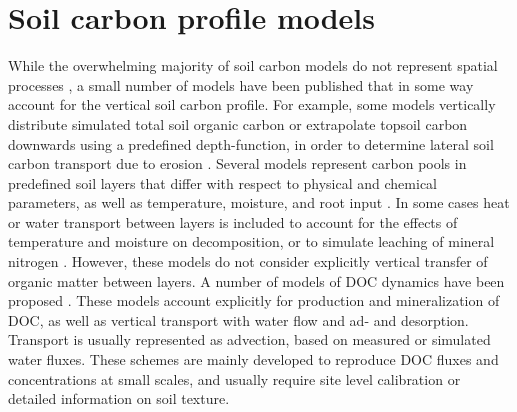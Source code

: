 \documentclass[11pt, oneside, a4paper]{article}   	%
\begin{document}


\section{Soil carbon profile models} \label{sec:models}
While the overwhelming majority of soil carbon models do not represent spatial processes \citep{Manzoni2009}, a small number of models have been published that in some way account for the
vertical soil carbon profile. For example, some models vertically distribute simulated total soil organic carbon or extrapolate topsoil carbon downwards using a predefined
depth-function, in order to determine lateral soil carbon transport due to erosion
\citep{Rosenbloom2001, Hilinski2001}. Several models represent carbon pools in
predefined soil layers that differ with respect to physical and chemical parameters,
as well as temperature, moisture, and root input \citep{vanVeen1981, Grant1993}. In some cases heat or water transport between layers is included to account for the effects of temperature and moisture on decomposition, or to simulate
leaching of mineral nitrogen \citep{Hansen1991, Li1992}. However, these
models do not consider explicitly vertical transfer of organic matter between layers.
A number of models of DOC dynamics have been
proposed \citep{Michalzik2003, Neff2001, Gjettermann2008, Brovelli2012}. These models account explicitly for production and mineralization of DOC, as well as vertical transport with water flow and ad- and desorption. Transport is usually represented as advection, based on measured or simulated
water fluxes. These schemes are mainly developed to reproduce DOC fluxes and
concentrations at small scales, and usually require site level calibration or detailed
information on soil texture.
\end{document}
